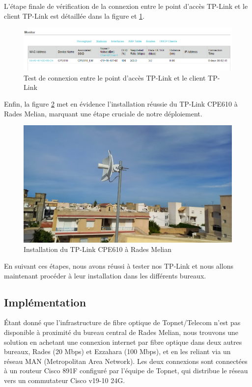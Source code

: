 L'étape finale de vérification de la connexion entre le point d'accès TP-Link et le client TP-Link est détaillée dans la figure et \ref{Chap2.3.11}.


\begin{figure}[H]
\centering
\includegraphics[width=15cm]{Images/TPLink4.png}
\caption{Test de connexion entre le point d'accès TP-Link et le client TP-Link}
\label{Chap2.3.11}
\end{figure}

Enfin, la figure \ref{Chap2.3.12} met en évidence l'installation réussie du TP-Link CPE610 à Rades Melian, marquant une étape cruciale de notre déploiement.

\begin{figure}[H]
\centering
\includegraphics[width=15cm]{Images/BRadesMelian-TPLinkCEP610-1.jpeg}
\caption{Installation du TP-Link CPE610 à Rades Melian}
\label{Chap2.3.12}
\end{figure}

En suivant ces étapes, nous avons réussi à tester nos TP-Link et nous allons maintenant procéder à leur installation dans les différents bureaux.


  
\subsection{Implémentation}




Étant donné que l'infrastructure de fibre optique de Topnet/Telecom n'est pas disponible à proximité du bureau central de Rades Melian, nous trouvons une solution en achetant une connexion internet par fibre optique dans deux autres bureaux, Rades (20 Mbps) et Ezzahara (100 Mbps), et en les reliant via un réseau MAN (Metropolitan Area Network). Les deux connexions sont connectées à un routeur Cisco 891F configuré par l'équipe de Topnet, qui distribue le réseau vers un commutateur Cisco v19-10 24G. 


